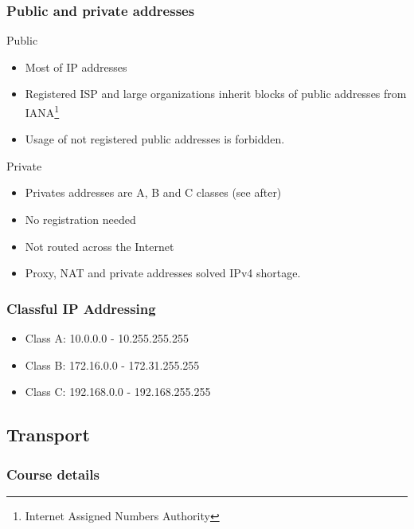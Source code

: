   \begin{frame}
    \frametitle{Public and private addresses}
    \begin{block}{Public}
      \begin{itemize}
        \item Most of IP addresses \pause
        \item Registered ISP and large organizations inherit blocks of public addresses from IANA\footnote{Internet Assigned Numbers Authority} \pause
        \item Usage of not registered public addresses is forbidden.
      \end{itemize}
    \end{block}
    \begin{block}{Private}
      \begin{itemize}
        \item Privates addresses are A, B and C classes (see after)\pause
        \item No registration needed \pause
        \item Not routed across the Internet \pause
        \item Proxy, NAT and private addresses solved IPv4 shortage.
      \end{itemize}
    \end{block}
  \end{frame}

  \begin{frame}
    \frametitle{Classful IP Addressing}
    \begin{itemize}
      \item Class A: 10.0.0.0 - 10.255.255.255
      \item Class B: 172.16.0.0 - 172.31.255.255
      \item Class C: 192.168.0.0 - 192.168.255.255
    \end{itemize}
  \end{frame}









\subsection{Transport}
  \begin{frame}
    \frametitle{Course details}
  \end{frame}
